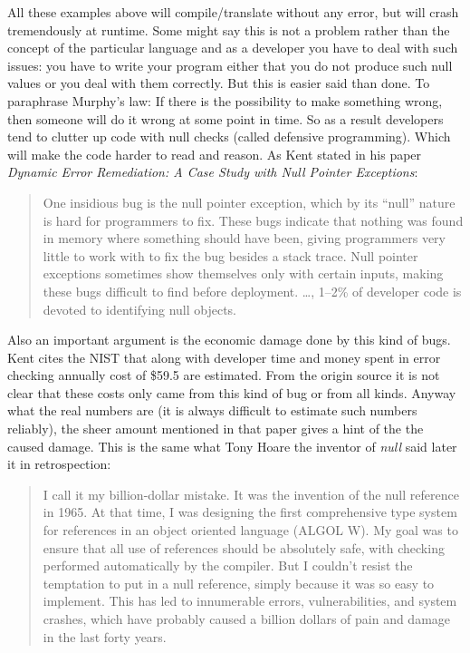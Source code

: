 \documentclass[11pt, a4paper]{report}
\begin{document}
All these examples above will compile/translate without any error, but will crash tremendously at runtime. Some might say this is not a problem rather than the concept of the particular language and as a developer you have to deal with such issues: you have to write your program either that you do not produce such null values or you deal with them correctly. But this is easier said than done. To paraphrase Murphy's law\cite{murphys-law}: If there is the possibility to make something wrong, then someone will do it wrong at some point in time. So as a result developers tend to clutter up code with null checks (called defensive programming). Which will make the code harder to read and reason. As Kent\cite{kent-dyn-err-remediation} stated in his paper \textit{Dynamic Error Remediation: A Case Study with Null Pointer Exceptions}:

\begin{quotation}
    One insidious bug is the null pointer exception, which by its ``null'' nature is hard for programmers to fix. These bugs indicate that nothing was found in memory where something should have been, giving programmers very little to work with to fix the bug besides a stack trace. Null pointer exceptions sometimes show themselves only with certain inputs, making these bugs difficult to find before deployment. \ldots, 1--2\% of developer code is devoted to identifying null objects.
\end{quotation}

Also an important argument is the economic damage done by this kind of bugs. Kent\cite{kent-dyn-err-remediation} cites the NIST that along with developer time and money spent in error checking annually cost of \$59.5 are estimated. From the origin source it is not clear that these costs only came from this kind of bug or from all kinds. Anyway what the real numbers are (it is always difficult to estimate such numbers reliably), the sheer amount mentioned in that paper gives a hint of the the caused damage. This is the same what Tony Hoare\cite{hoare-wiki} the inventor of \textit{null} said later it\cite{hoeare-null} in retrospection:

\begin{quotation}
    I call it my billion-dollar mistake. It was the invention of the null reference in 1965. At that time, I was designing the first comprehensive type system for references in an object oriented language (ALGOL W). My goal was to ensure that all use of references should be absolutely safe, with checking performed automatically by the compiler. But I couldn't resist the temptation to put in a null reference, simply because it was so easy to implement. This has led to innumerable errors, vulnerabilities, and system crashes, which have probably caused a billion dollars of pain and damage in the last forty years.	
\end{quotation} 
\end{document}

